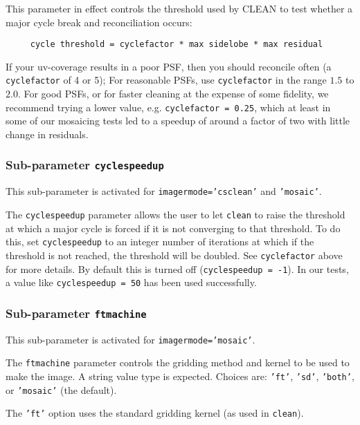This parameter in effect controls the threshold used by CLEAN to test whether
a major cycle break and reconciliation occurs:
\small
\begin{verbatim}
     cycle threshold = cyclefactor * max sidelobe * max residual
\end{verbatim}
\normalsize

If your uv-coverage results in a poor PSF, then you should reconcile often
(a {\tt cyclefactor} of 4 or 5); For reasonable PSFs, use {\tt cyclefactor} in the range
$1.5$ to $2.0$.  For good PSFs, or for faster cleaning at the expense
of some fidelity, we recommend trying a lower value, e.g. 
{\tt cyclefactor = 0.25}, which at least in some of our mosaicing
tests led to a speedup of
around a factor of two with little change in residuals.

\subsubsection{Sub-parameter {\tt cyclespeedup} }
\label{section:im.clean.imagermode.cyclespeedup}

This sub-parameter is activated for {\tt imagermode='csclean'} and
{\tt 'mosaic'}.

The {\tt cyclespeedup} parameter allows the user to let {\tt clean}
to raise the threshold at which a major cycle is forced if it is not
converging to that threshold.  To do this, set {\tt cyclespeedup} to
an integer number of iterations at which if the threshold is not reached,
the threshold will be doubled.  See {\tt cyclefactor} above for more
details.  By default this is turned off ({\tt cyclespeedup = -1}).
In our tests, a value like {\tt cyclespeedup = 50} has been used successfully.

\subsubsection{Sub-parameter {\tt ftmachine} }
\label{section:im.imagermode.mosaic.ftmachine}

This sub-parameter is activated for {\tt imagermode='mosaic'}.

The {\tt ftmachine} parameter controls the gridding method and kernel to be
used to make the image.  A string value type is expected.
Choices are: {\tt 'ft'}, {\tt 'sd'}, {\tt 'both'}, or {\tt 'mosaic'} (the default).

The {\tt 'ft'} option uses the standard gridding kernel (as used in 
{\tt clean}).

